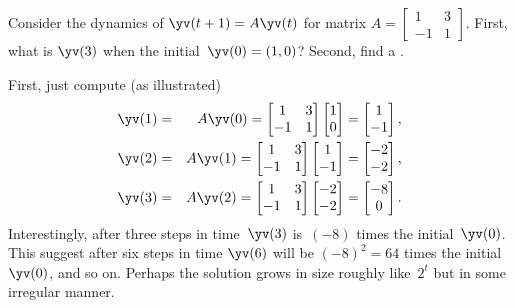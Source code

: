 \begin{example} \label{eg:2x2ccgrow}
Consider the dynamics of \(\yv(t+1)=A\yv(t)\) for matrix \(A=\begin{bmatrix} 1&3\\-1&1 \end{bmatrix}\).
First, what is \(\yv(3)\) when the initial~\(\yv(0)=(1,0)\)?
Second, find a .
\begin{solution} 
First, just compute (as illustrated)
\begin{eqnarray*}
\yv(1)&=&A\yv(0)=\begin{bmatrix} 1&3\\-1&1 \end{bmatrix}
\begin{bmatrix} 1\\0 \end{bmatrix}
=\begin{bmatrix} 1\\-1 \end{bmatrix},
\\\yv(2)&=&A\yv(1)=\begin{bmatrix} 1&3\\-1&1 \end{bmatrix}
\begin{bmatrix} 1\\-1 \end{bmatrix}
=\begin{bmatrix} -2\\-2 \end{bmatrix},
\\\yv(3)&=&A\yv(2)=\begin{bmatrix} 1&3\\-1&1 \end{bmatrix}
\begin{bmatrix} -2\\-2 \end{bmatrix}
=\begin{bmatrix} -8\\0 \end{bmatrix}.
\end{eqnarray*}
%
Interestingly, after three steps in time~\(\yv(3)\) is~\((-8)\) times the initial~\(\yv(0)\).
This suggest after six steps in time \(\yv(6)\) will be \((-8)^2=64\) times the initial~\(\yv(0)\), and so on.
Perhaps the solution grows in size roughly like~\(2^t\) but in some irregular manner.


\end{solution}
\end{example}
